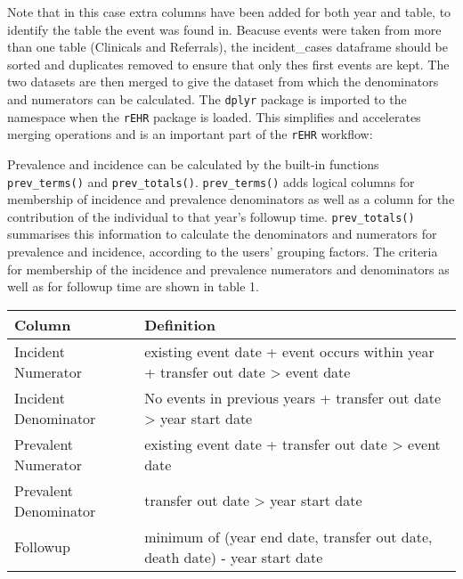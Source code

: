 \documentclass[]{article}
\newenvironment{Shaded}{\begin{snugshade}}{\end{snugshade}}
\newcommand{\KeywordTok}[1]{\textcolor[rgb]{0.13,0.29,0.53}{\textbf{{#1}}}}
\newcommand{\StringTok}[1]{\textcolor[rgb]{0.31,0.60,0.02}{{#1}}}
\newcommand{\NormalTok}[1]{{#1}}
\begin{document}
Note that in this case extra columns have been added for both year and
table, to identify the table the event was found in. Beacuse events were
taken from more than one table (Clinicals and Referrals), the
incident\_cases dataframe should be sorted and duplicates removed to
ensure that only thes first events are kept. The two datasets are then
merged to give the dataset from which the denominators and numerators
can be calculated. The \texttt{dplyr} package is imported to the
namespace when the \texttt{rEHR} package is loaded. This simplifies and
accelerates merging operations and is an important part of the
\texttt{rEHR} workflow:

\begin{Shaded}
\end{Shaded}

Prevalence and incidence can be calculated by the built-in functions
\texttt{prev\_terms()} and \texttt{prev\_totals()}.
\texttt{prev\_terms()} adds logical columns for membership of incidence
and prevalence denominators as well as a column for the contribution of
the individual to that year's followup time. \texttt{prev\_totals()}
summarises this information to calculate the denominators and numerators
for prevalence and incidence, according to the users' grouping factors.
The criteria for membership of the incidence and prevalence numerators
and denominators as well as for followup time are shown in table 1.

\begin{longtable}[c]{@{}ll@{}}
\toprule
Column & Definition\tabularnewline
\midrule
\endhead
Incident Numerator & existing event date + event occurs within year +
transfer out date \textgreater{} event date\tabularnewline
Incident Denominator & No events in previous years + transfer out date
\textgreater{} year start date\tabularnewline
Prevalent Numerator & existing event date + transfer out date
\textgreater{} event date\tabularnewline
Prevalent Denominator & transfer out date \textgreater{} year start
date\tabularnewline
Followup & minimum of (year end date, transfer out date, death date) -
year start date\tabularnewline
\bottomrule
\end{longtable}
\end{document}
